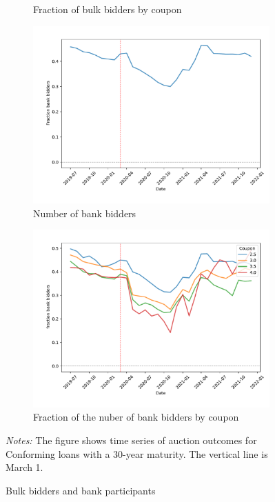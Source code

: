 \documentclass[11pt,a4paper]{article}
\begin{document}
\begin{figure}[h]
\begin{subfigure}[b]{0.49\textwidth}
      \caption{ Fraction of bulk bidders by coupon}
     \end{subfigure}
     \begin{subfigure}[b]{0.49\textwidth}
      \includegraphics[width=0.998\textwidth]{../results/figures/fraction_banks_mean_mat30_loan1_timeseries_nrmonthly_2.5_4_.pdf}
      \caption{  Number of bank bidders}
     \end{subfigure}
       \begin{subfigure}[b]{0.49\textwidth}
        \includegraphics[width=0.998\textwidth]{../results/figures/fraction_banks_mean_mat30_loan1_timeseries_cpmonthly_2.5_4_.pdf}
        \caption{ Fraction of the nuber of bank bidders by coupon}
       \end{subfigure}
     \caption{Bulk bidders and bank participants} 
   \begin{minipage}{\textwidth}
      \footnotesize{\textit{Notes:} The figure shows time series of auction outcomes for Conforming loans with a 30-year maturity. The vertical line is March 1.  } 
      \end{minipage}
\end{figure}
\end{document}
